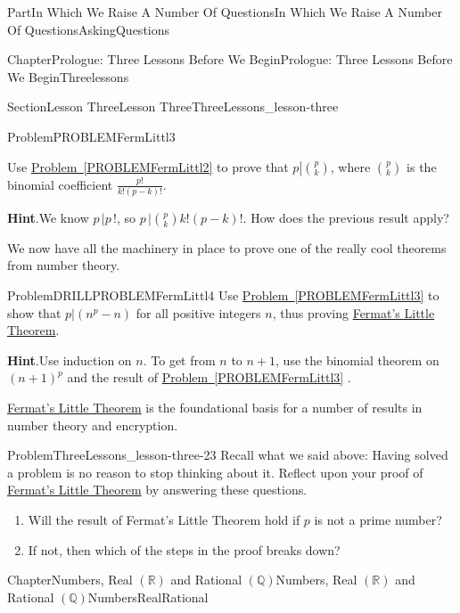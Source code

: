 \documentclass[oneside,10pt,]{book}
\newcommand{\blocktitlefont}{\relax}
\newcommand{\xreffont}{\relax}
\numberwithin{equation}{part}
\newcommand{\RR}{\mathbb {R}}
\newcommand{\QQ}{\mathbb {Q}}
\begin{document}
\begin{partptx}{Part}{In Which We Raise A Number Of Questions}{}{In Which We Raise A Number Of Questions}{}{}{AskingQuestions}
\begin{chapterptx}{Chapter}{Prologue: Three Lessons Before We Begin}{}{Prologue: Three Lessons Before We Begin}{}{}{Threelessons}
\begin{sectionptx}{Section}{Lesson Three}{}{Lesson Three}{}{}{ThreeLessons_lesson-three}
\begin{problem}{Problem}{}{PROBLEMFermLittl3}
\par
Use \hyperref[PROBLEMFermLittl2]{Problem~{\xreffont\ref{PROBLEMFermLittl2}}} to prove that \(p\left|{p \choose{}k}\right.\), where \({p
\choose{}k}\) is the binomial coefficient \(\frac{p!}{k!(p-k)!}\).%
\par\smallskip%
\noindent\textbf{\blocktitlefont Hint}.\hypertarget{PROBLEMFermLittl3-3}{}\quad{}We know \(p\,|p\,!\), so \(p\,|{p \choose{}k}k!(p-k)!\). How does the previous result apply?%
\end{problem}
We now have all the machinery in place to prove one of the really cool theorems from number theory.%
\begin{problem}{Problem}{}{DRILLPROBLEMFermLittl4}%
Use \hyperref[PROBLEMFermLittl3]{Problem~{\xreffont\ref{PROBLEMFermLittl3}}} to show that \(p|(n^p-n)\) for all positive integers \(n\), thus proving \hyperref[thm_FermatsLittleTheorem]{Fermat's Little Theorem}.%
\par\smallskip%
\noindent\textbf{\blocktitlefont Hint}.\hypertarget{DRILLPROBLEMFermLittl4-3}{}\quad{}Use induction on \(n\).  To get from \(n\) to \(n+1\), use the binomial theorem on \((n+1)^p\) and the result of \hyperref[PROBLEMFermLittl3]{Problem~{\xreffont\ref{PROBLEMFermLittl3}}} .%
\end{problem}
\hyperref[thm_FermatsLittleTheorem]{Fermat's Little Theorem} is the foundational basis for a number of results in number theory and encryption.%
\begin{problem}{Problem}{}{ThreeLessons_lesson-three-23}%
Recall what we said above: Having solved a problem is no reason to stop thinking about it. Reflect upon your proof of \hyperref[thm_FermatsLittleTheorem]{Fermat's Little Theorem} by answering these questions.%
\begin{enumerate}[font=\bfseries,label=(\alph*),ref=\alph*]%
\item{}Will the result of Fermat's Little Theorem hold if \(p\) is not a prime number?%
\item{}If not, then which of the steps in the proof breaks down?%
\end{enumerate}%
\end{problem}
\end{sectionptx}
\end{chapterptx}
%
%
\typeout{************************************************}
\typeout{Chapter 2 Numbers, Real \(\left(\RR\right)\) and Rational \(\left(\QQ\right)\)}
\typeout{************************************************}
%
\begin{chapterptx}{Chapter}{Numbers, Real \(\left(\RR\right)\) and Rational \(\left(\QQ\right)\)}{}{Numbers, Real \(\left(\RR\right)\) and Rational \(\left(\QQ\right)\)}{}{}{NumbersRealRational}

\end{chapterptx}
\end{partptx}
\end{document}
